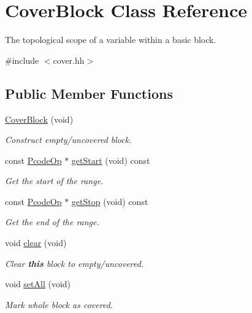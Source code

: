 \hypertarget{class_cover_block}{}\section{Cover\+Block Class Reference}
\label{class_cover_block}


The topological scope of a variable within a basic block.  




{\ttfamily \#include $<$cover.\+hh$>$}

\subsection*{Public Member Functions}
\begin{DoxyCompactItemize}
\item 
\mbox{\hyperlink{class_cover_block_a1b86770acf90e77a85a9a5b3f7f408f6}{Cover\+Block}} (void)
\begin{DoxyCompactList}\small\item\em Construct empty/uncovered block. \end{DoxyCompactList}\item 
const \mbox{\hyperlink{class_pcode_op}{Pcode\+Op}} $\ast$ \mbox{\hyperlink{class_cover_block_a9871d2c0a1f58701fc43125de929783e}{get\+Start}} (void) const
\begin{DoxyCompactList}\small\item\em Get the start of the range. \end{DoxyCompactList}\item 
const \mbox{\hyperlink{class_pcode_op}{Pcode\+Op}} $\ast$ \mbox{\hyperlink{class_cover_block_ad436bf26eddb13766c89480390ec3cc6}{get\+Stop}} (void) const
\begin{DoxyCompactList}\small\item\em Get the end of the range. \end{DoxyCompactList}\item 
void \mbox{\hyperlink{class_cover_block_a735783c16ee76a3072a541601e01085c}{clear}} (void)
\begin{DoxyCompactList}\small\item\em Clear {\bfseries{this}} block to empty/uncovered. \end{DoxyCompactList}\item 
void \mbox{\hyperlink{class_cover_block_acf6e1171ca6513855789a057f9c4f92c}{set\+All}} (void)
\begin{DoxyCompactList}\small\item\em Mark whole block as covered. \end{DoxyCompactList}\item 

\end{DoxyCompactItemize}
